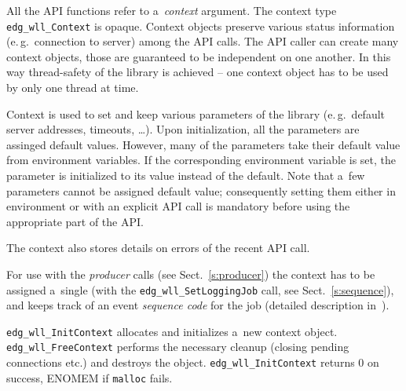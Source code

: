 \documentclass{egee}
\def\eg{e.\,g.\xspace}
\begin{document}
All the API functions refer to a~\emph{context} argument.
The context type \verb'edg_wll_Context' is opaque.
Context objects preserve various status information
(\eg\ connection to server) among the API calls.
The API caller can create many context objects, those are guaranteed
to be independent on one another.
In this way thread-safety of the library is achieved --
one context object has to be used by only one thread at time.

Context is used to set and keep various parameters of the library
(\eg\ default server addresses, timeouts, \dots).
Upon initialization, all the parameters are assinged default values.
However, many of the parameters take their default value from environment
variables. If the corresponding environment variable is set,
the parameter is initialized to its value instead of the default.
Note that a~few parameters cannot be assigned default value; consequently
setting them either in environment or with an explicit API call
is mandatory before using the appropriate part of the API.

The context also stores details on errors of the recent API call.

For use with the \emph{producer} calls (see Sect.~\ref{s:producer})
the context has to be assigned a~single \jobid
(with the \verb'edg_wll_SetLoggingJob' call, see Sect.~\ref{s:sequence}),
and keeps track of an event \emph{sequence code} for the job 
(detailed description in~\cite{lbarch}).

\Synopsis
{}

%
\Description
\verb'edg_wll_InitContext' allocates and initializes a~new context object.
\verb'edg_wll_FreeContext' performs the necessary cleanup (closing pending
connections etc.) and destroys the object.
%
\Return
\verb'edg_wll_InitContext' returns 0 on success,
ENOMEM if \verb'malloc' fails.

\Synopsis


\end{document}
